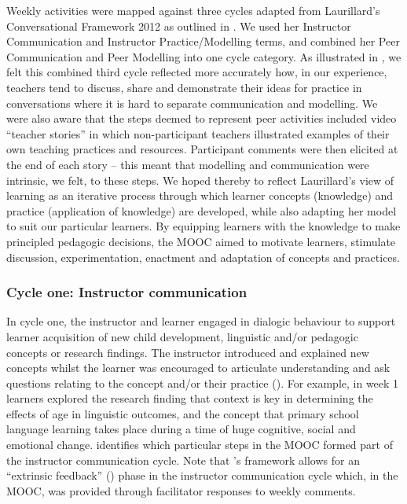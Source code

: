 \documentclass[output=paper]{langscibook}
\begin{document}
Weekly activities were mapped against three cycles adapted from Laurillard’s Conversational Framework 2012 as outlined in . We used her Instructor Communication and Instructor Practice/Modelling terms, and combined her Peer Communication and Peer Modelling into one cycle category. As illustrated in , we felt this combined third cycle reflected more accurately how, in our experience, teachers tend to discuss, share and demonstrate their ideas for practice in conversations where it is hard to separate communication and modelling. We were also aware that the steps deemed to represent peer activities included video ``teacher stories'' in which non-participant teachers illustrated examples of their own teaching practices and resources. Participant comments were then elicited at the end of each story -- this meant that modelling and communication were intrinsic, we felt, to these steps. We hoped thereby to reflect Laurillard’s view of learning as an iterative process through which learner concepts (knowledge) and practice (application of knowledge) are developed, while also adapting her model to suit our particular learners. By equipping learners with the knowledge to make principled pedagogic decisions, the MOOC aimed to motivate learners, stimulate discussion, experimentation, enactment and adaptation of concepts and practices. 

\subsubsection{Cycle one: Instructor communication}\label{sec:porter:2.1.1}

In cycle one, the instructor and learner engaged in dialogic behaviour to support learner acquisition of new child development, linguistic and/or pedagogic concepts or research findings. The instructor introduced and explained new concepts whilst the learner was encouraged to articulate understanding and ask questions relating to the concept and/or their practice (\citealt{Laurillard2012}). For example, in week 1 learners explored the research finding that context is key in determining the effects of age in linguistic outcomes, and the concept that primary school language learning takes place during a time of huge cognitive, social and emotional change.  identifies which particular steps in the MOOC formed part of the instructor communication cycle. Note that \citeauthor{Laurillard2012}’s framework allows for an ``extrinsic feedback'' (\citeyear[95]{Laurillard2012}) phase in the instructor communication cycle which, in the MOOC, was provided through facilitator responses to weekly comments.
\end{document}

